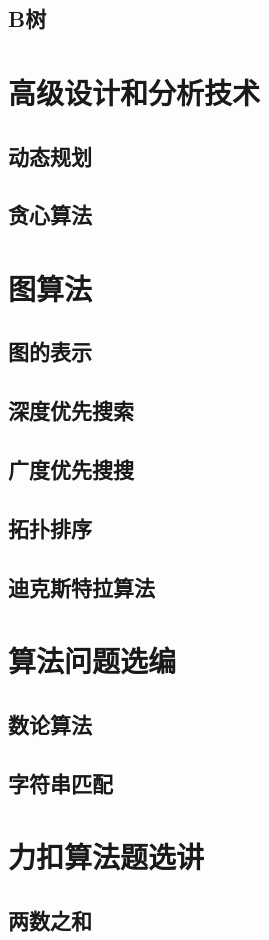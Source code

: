 \documentclass[oneside,10pt]{ctexbook}
\begin{document}
\chapter{B树}

\part{高级设计和分析技术}

\chapter{动态规划}

\chapter{贪心算法}

\part{图算法}

\chapter{图的表示}

\chapter{深度优先搜索}

\chapter{广度优先搜搜}

\chapter{拓扑排序}

\chapter{迪克斯特拉算法}

\part{算法问题选编}

\chapter{数论算法}

\chapter{字符串匹配}

\part{力扣算法题选讲}

\chapter{两数之和}
\end{document}
